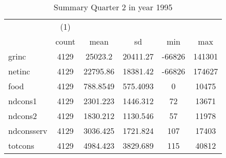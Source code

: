\begin{table}[htbp]\centering
\def\sym#1{\ifmmode^{#1}\else\(^{#1}\)\fi}
\caption{Summary Quarter 2 in year 1995 \label{sum\_Q2\_y1995}}
\begin{tabular}{l*{1}{ccccc}}
\hline\hline
            &\multicolumn{1}{c}{(1)}&            &            &            &            \\
            &       count&        mean&          sd&         min&         max\\
\hline
grinc       &        4129&     25023.2&    20411.27&      -66826&      141301\\
netinc      &        4129&    22795.86&    18381.42&      -66826&      174627\\
food        &        4129&    788.8549&    575.4093&           0&       10475\\
ndcons1     &        4129&    2301.223&    1446.312&          72&       13671\\
ndcons2     &        4129&    1830.212&    1130.546&          57&       11978\\
ndconsserv  &        4129&    3036.425&    1721.824&         107&       17403\\
totcons     &        4129&    4984.423&    3829.689&         115&       40812\\
\hline\hline
\end{tabular}
\end{table}
